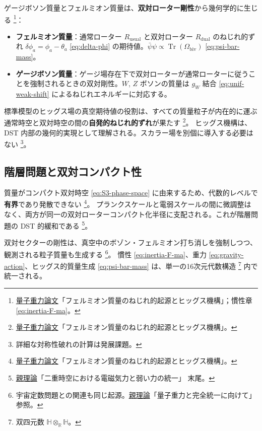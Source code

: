\documentclass[dvipdfmx,a4paper,oneside]{jsbook}
\numberwithin{equation}{chapter}
\begin{document}
ゲージボソン質量とフェルミオン質量は、\textbf{双対ローター剛性}から幾何学的に生じる \footnote{\hyperref[sec:sister-manuscripts]{量子重力論文}「フェルミオン質量のねじれ的起源とヒッグス機構」；慣性章 \eqref{eq:inertia-F-ma}。}：
\begin{itemize}[leftmargin=2em]
  \item \textbf{フェルミオン質量}：通常ローター \(R_{\mathrm{usual}}\) と双対ローター \(R_{\mathrm{dual}}\) のねじれ的ずれ \(\delta\phi_a = \phi_a - \theta_a\) \eqref{eq:delta-phi} の期待値。\(\bar\psi\psi \propto \operatorname{Tr}(\Omega_{\mathrm{biv}})\) \eqref{eq:psi-bar-mass}。
  \item \textbf{ゲージボソン質量}：ゲージ場存在下で双対ローターが通常ローターに従うことを強制されるときの双対剛性。\(W\), \(Z\) ボソンの質量は \(g_W\) 結合 \eqref{eq:unif-weak-shift} によるねじれエネルギーに対応する。
\end{itemize}

標準模型のヒッグス場の真空期待値の役割は、すべての質量粒子が内在的に運ぶ通常時空と双対時空の間の\textbf{自発的ねじれ的ずれ}が果たす \footnote{\hyperref[sec:sister-manuscripts]{量子重力論文}「フェルミオン質量のねじれ的起源とヒッグス機構」。}。
ヒッグス機構は、DST 内部の幾何的実現として理解される。スカラー場を別個に導入する必要はない \footnote{詳細な対称性破れの計算は発展課題。}。

\subsection{階層問題と双対コンパクト性}

質量がコンパクト双対時空 \eqref{eq:S3-phase-space} に由来するため、代数的レベルで\textbf{有界}であり発散できない \footnote{\hyperref[sec:sister-manuscripts]{量子重力論文}「フェルミオン質量のねじれ的起源とヒッグス機構」。}。
プランクスケールと電弱スケールの間に微調整はなく、両方が同一の双対ローターコンパクト化半径に支配される。これが階層問題の DST 的緩和である \footnote{\hyperref[sec:sister-manuscripts]{親理論}「二重時空における電磁気力と弱い力の統一」 末尾。}。

双対セクターの剛性は、真空中のボゾン・フェルミオン打ち消しを強制しつつ、観測される粒子質量も生成する \footnote{宇宙定数問題との関連も同じ起源。\hyperref[sec:sister-manuscripts]{親理論}「量子重力と完全統一に向けて」参照。}。
慣性 \eqref{eq:inertia-F-ma}、重力 \eqref{eq:gravity-action}、ヒッグス的質量生成 \eqref{eq:psi-bar-mass} は、単一の16次元代数構造 \footnote{双四元数 \(\mathbb{H} \otimes_{\mathbb{R}} \mathbb{H}\)。} 内で統一される。
\end{document}
